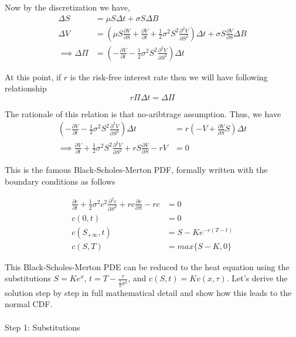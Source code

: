 \documentclass[
  letterpaper,
  DIV=11,
  numbers=noendperiod]{scrartcl}
\makeatletter
\let\oldparagraph\paragraph
\renewcommand{\paragraph}{
    \@ifstar
      \xxxParagraphStar
      \xxxParagraphNoStar
  }
\newcommand{\xxxParagraphStar}[1]{\oldparagraph*{#1}\mbox{}}
\newcommand{\xxxParagraphNoStar}[1]{\oldparagraph{#1}\mbox{}}
\makeatother
\begin{document}
Now by the discretization we have, \begin{align*}
\Delta S &= \mu S \Delta t +\sigma S \Delta B\\
\Delta V & = \left(\mu S\frac{\partial V}{\partial S}+\frac{\partial V}{\partial t}+\frac{1}{2}\sigma^2S^2\frac{\partial^2 V}{\partial S^2}\right)\Delta t+\sigma S\frac{\partial V}{\partial S}\Delta B\\
\implies \Delta \Pi  & = \left(-\frac{\partial V}{\partial t} -\frac{1}{2}\sigma^2S^2\frac{\partial^2 V}{\partial S^2}\right)\Delta t
\end{align*}

At this point, if \(r\) is the risk-free interest rate then we will have
following relationship \[
r\Pi \Delta t = \Delta \Pi 
\]

The rationale of this relation is that no-aribtrage assumption. Thus, we
have\\
\begin{align*}
\left(-\frac{\partial V}{\partial t} -\frac{1}{2}\sigma^2S^2\frac{\partial^2 V}{\partial S^2}\right)\Delta t & = r \left(- V + \frac{\partial V}{\partial S} S\right)\Delta t \\
\implies \frac{\partial V}{\partial t} + \frac{1}{2} \sigma^2 S^2 \frac{\partial^2 V}{\partial S^2} + rS \frac{\partial V}{\partial S} -rV &=0
\end{align*}

This is the famous Black-Scholes-Merton PDF, formally written with the
boundary conditions as follows

\begin{align*}
\frac{\partial c}{\partial t} + \frac{1}{2} \sigma^2 c^2 \frac{\partial^2 c}{\partial S^2} + rc \frac{\partial c}{\partial S} -rc &=0\\
c(0,t) &= 0\\ 
c(S_{+\infty}, t) &= S - Ke^{-r(T-t)}\\
c(S,T) & = max\{S-K,0\}
\end{align*}

This Black-Scholes-Merton PDE can be reduced to the heat equation using
the substitutions \(S = K e^x\),
\(t = T - \frac{\tau}{\frac{1}{2} \sigma^2}\), and
\(c(S, t) = K v(x, \tau)\). Let's derive the solution step by step in
full mathematical detail and show how this leads to the normal CDF.

\paragraph{Step 1: Substitutions}\label{step-1-substitutions}
\end{document}
